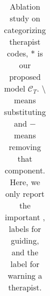 \begin{table}[t]
\begin{center}
{\begin{tabular}{cccccc}
\end{tabular}}
\end{center}
\caption{\label{tbl:rst_cxt_therapist} Ablation study on
  categorizing therapist codes, $*$ is our proposed model
  $\mathcal{C}_{T}$. $\setminus$ means substituting and $-$ means removing
  that component. Here, we only report the important \REC, \RES
  labels for
  guiding, and the \MIN label for warning a therapist. }
\end{table}

